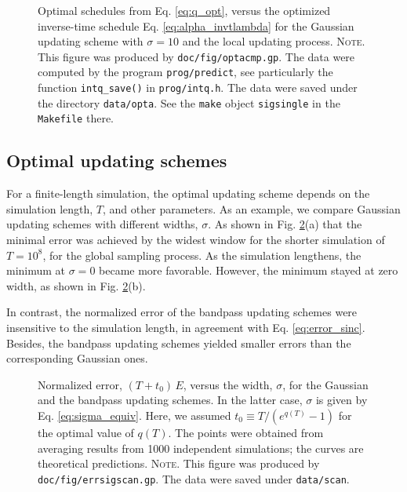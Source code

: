 \documentclass[reprint, floatfix]{revtex4-1}
\newcommand{\note}[1]{{\color{DarkGreen}\footnotesize \textsc{Note.} #1}}
\begin{document}
\begin{figure}[h]
\begin{center}
  \caption{
    \label{fig:optacmp}
    Optimal schedules from Eq. \eqref{eq:q_opt},
    versus the optimized inverse-time schedule
    Eq. \eqref{eq:alpha_invtlambda}
    for the Gaussian updating scheme
    with $\sigma = 10$
    and the local updating process.
    \note{This figure was produced by \texttt{doc/fig/optacmp.gp}.
      The data were computed by the program \texttt{prog/predict},
      see particularly the function \texttt{intq\_save()}
      in \texttt{prog/intq.h}.
      The data were saved under the directory \texttt{data/opta}.
      See the \texttt{make} object \texttt{sigsingle}
      in the \texttt{Makefile} there.
    }%
  }
\end{center}
\end{figure}




\subsection{\label{sec:results_cmpschemes}
Optimal updating schemes}



For a finite-length simulation,
the optimal updating scheme
depends on the simulation length, $T$,
and other parameters.
%
As an example,
we compare Gaussian updating schemes
with different widths, $\sigma$.
%
As shown in Fig. \ref{fig:errsigscan}(a)
that the minimal error was achieved
by the widest window for the shorter simulation
of $T = 10^8$,
for the global sampling process.
%
As the simulation lengthens,
the minimum at $\sigma = 0$ became more favorable.
%
However,
the minimum stayed at zero width,
as shown in Fig. \ref{fig:errsigscan}(b).


In contrast,
the normalized error of the bandpass updating schemes
were insensitive to the simulation length,
in agreement with Eq. \eqref{eq:error_sinc}.
%
Besides, the bandpass updating schemes
yielded smaller errors than
the corresponding Gaussian ones.



\begin{figure}[h]
\begin{center}
  \caption{
    \label{fig:errsigscan}
    Normalized error, $(T + t_0) \, E$,
    versus the width, $\sigma$,
    for the Gaussian
    and the bandpass updating schemes.
    In the latter case,
    $\sigma$ is given by Eq. \eqref{eq:sigma_equiv}.
    Here, we assumed $t_0 \equiv T/(e^{q(T)} - 1)$
    for the optimal value of $q(T)$.
    The points were obtained from averaging results
    from 1000 independent simulations;
    the curves are theoretical predictions.
    \note{This figure was produced by
      \texttt{doc/fig/errsigscan.gp}.
      The data were saved under
      \texttt{data/scan}.
    }%
  }
\end{center}
\end{figure}
\end{document}
